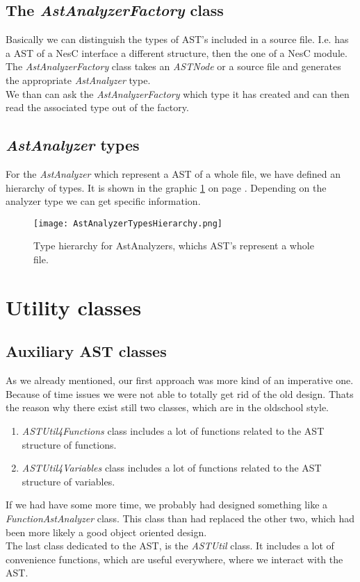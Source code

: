 \documentclass[a4paper,10pt]{report}
\begin{document}
\subsection{The {\it AstAnalyzerFactory} class}
Basically we can distinguish the types of AST's included in a source file. I.e. has a AST of a NesC interface a different structure, then the one of a NesC module.
The {\it AstAnalyzerFactory} class takes an {\it ASTNode} or a source file and generates the appropriate {\it AstAnalyzer} type.\\
We than can ask the {\it AstAnalyzerFactory} which type it has created and can then read the associated type out of the factory.

\subsection{{\it AstAnalyzer} types}
For the {\it AstAnalyzer} which represent a AST of a whole file, we have defined an hierarchy of types. It is shown in the graphic
\ref{AstAnalyzersTypeHierarchy} on page \pageref{AstAnalyzersTypeHierarchy}. Depending on the analyzer type we can get specific information.

\begin{figure}[h]
\centering
\texttt{[image: AstAnalyzerTypesHierarchy.png]}
\caption{Type hierarchy for AstAnalyzers, whichs AST's represent a whole file.}
\label{AstAnalyzersTypeHierarchy}

\end{figure}

\section{Utility classes}

\subsection{Auxiliary AST classes}
As we already mentioned, our first approach was more kind of an imperative one. Because of time issues we were not able to totally get rid of the old design. Thats the reason why there exist still two classes, which are in the oldschool style.
   \begin{enumerate}
     \item {\it ASTUtil4Functions} class includes a lot of functions related to the AST structure of functions.
     \item {\it ASTUtil4Variables} class includes a lot of functions related to the AST structure of variables.
   \end{enumerate}
If we had have some more time, we probably had designed something like a {\it FunctionAstAnalyzer} class. This class than had replaced the other two, which had been more likely a good object oriented design.\\
The last class dedicated to the AST, is the {\it ASTUtil} class. It includes a lot of convenience functions, which are useful everywhere, where we interact with the AST.
\end{document}
